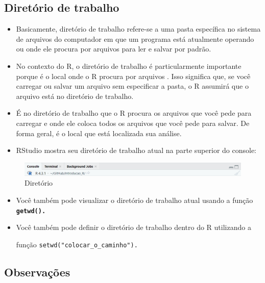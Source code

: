 \documentclass[
  letterpaper,
  DIV=11,
  numbers=noendperiod]{scrartcl}
\begin{document}
\subsection{Diretório de trabalho}\label{diretuxf3rio-de-trabalho}

\begin{itemize}
\item
  Basicamente, diretório de trabalho refere-se a uma pasta específica no
  sistema de arquivos do computador em que um programa está atualmente
  operando ou onde ele procura por arquivos para ler e salvar por
  padrão.
\item
  No contexto do R, o diretório de trabalho é particularmente importante
  porque é o local onde o R procura por arquivos . Isso significa que,
  se você carregar ou salvar um arquivo sem especificar a pasta, o R
  assumirá que o arquivo está no diretório de trabalho.
\item
  É no diretório de trabalho que o R procura os arquivos que você pede
  para carregar e onde ele coloca todos os arquivos que você pede para
  salvar. De forma geral, é o local que está localizada sua análise.
\item
  RStudio mostra seu diretório de trabalho atual na parte superior do
  console:
\end{itemize}

\begin{figure}[H]

{\centering \includegraphics{Figuras/dir.png}

}

\caption{Diretório}

\end{figure}%

\begin{itemize}
\item
  Você também pode visualizar o diretório de trabalho atual usando a
  função \textbf{\texttt{getwd().}}
\item
  Você também pode definir o diretório de trabalho dentro do R
  utilizando a

  função \texttt{setwd("colocar\_o\_caminho").}
\end{itemize}

\subsection{Observações}\label{observauxe7uxf5es}
\end{document}
